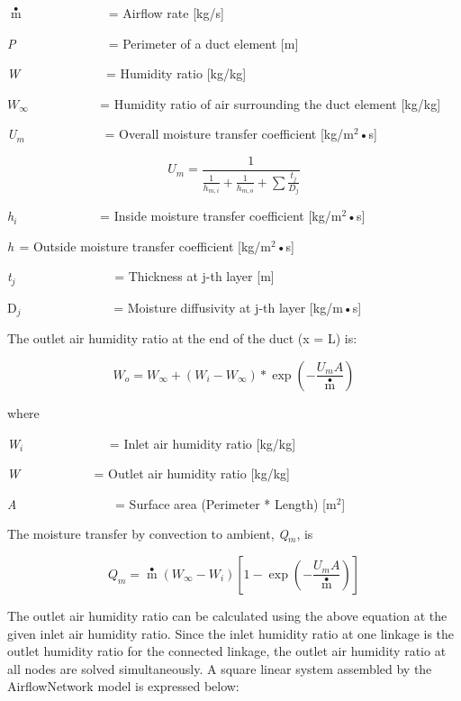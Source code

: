 \(\mathop m\limits^ \bullet\) ~~~~~~~~~~~~ = Airflow rate {[}kg/s{]}

\emph{P~~~}~~~~~~~~~~~ = Perimeter of a duct element {[}m{]}

\emph{W~~}~~~~~~~~~~~ = Humidity ratio {[}kg/kg{]}

\(W{}_\infty\) ~~~~~~~~~~ = Humidity ratio of air surrounding the duct element {[}kg/kg{]}

\emph{U\(_{m}\)}~~~~~~~~~~~~ = Overall moisture transfer coefficient {[}kg/m\(^{2}\)•s{]}

\begin{equation}
{U_m} = \frac{1}{{\frac{1}{{{h_{m,i}}}} + \frac{1}{{{h_{m,o}}}} + \sum {\frac{{{t_j}}}{{{D_j}}}} }}
\end{equation}

\emph{h\(_{i}\)} \(_{ }\) ~~~~~~~~~~~ = Inside moisture transfer coefficient {[}kg/m\(^{2}\)•s{]}

\emph{h\(_{ }\)}\(_{ }\) = Outside moisture transfer coefficient {[}kg/m\(^{2}\)•s{]}

\emph{t\(_{j}\)}~~~~~~~~~~~~~~~ = Thickness at j-th layer {[}m{]}

D\(_{j}\)~~~~~~~~~~~~~~ = Moisture diffusivity at j-th layer {[}kg/m•s{]}

The outlet air humidity ratio at the end of the duct (x = L) is:

\begin{equation}
{W_o} = {W_\infty } + ({W_i} - {W_\infty })*\exp \left( { - \frac{{{U_m}A}}{{\mathop m\limits^ \bullet  }}} \right)
\end{equation}

where

\emph{W\(_{i}\)}~~~~~~~~~~~~~ = Inlet air humidity ratio {[}kg/kg{]}

\emph{W\(_{ }\)}~~~~~~~~~~~ = Outlet air humidity ratio {[}kg/kg{]}

\emph{A}~~~~~~~~~~~~~~~ = Surface area (Perimeter * Length) {[}m\(^{2}\){]}

The moisture transfer by convection to ambient, \emph{Q\(_{m}\)}, is

\begin{equation}
{Q_m} = \mathop m\limits^ \bullet  ({W_\infty } - {W_i})\left[ {1 - \exp \left( { - \frac{{{U_m}A}}{{\mathop m\limits^ \bullet  }}} \right)} \right]
\end{equation}

The outlet air humidity ratio can be calculated using the above equation at the given inlet air humidity ratio. Since the inlet humidity ratio at one linkage is the outlet humidity ratio for the connected linkage, the outlet air humidity ratio at all nodes are solved simultaneously. A square linear system assembled by the AirflowNetwork model is expressed below:

